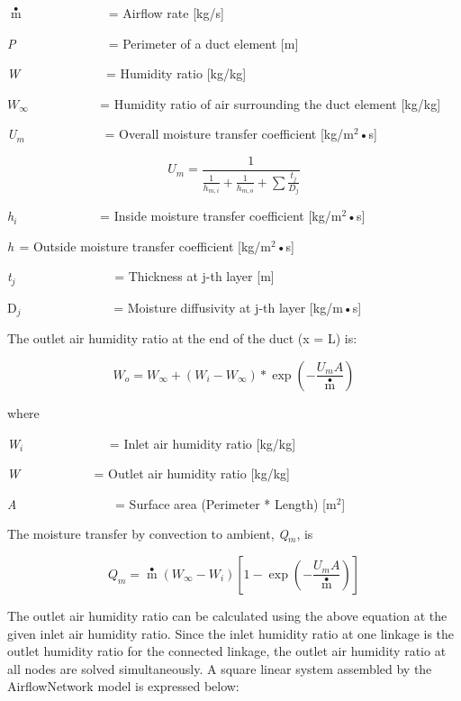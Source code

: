 \(\mathop m\limits^ \bullet\) ~~~~~~~~~~~~ = Airflow rate {[}kg/s{]}

\emph{P~~~}~~~~~~~~~~~ = Perimeter of a duct element {[}m{]}

\emph{W~~}~~~~~~~~~~~ = Humidity ratio {[}kg/kg{]}

\(W{}_\infty\) ~~~~~~~~~~ = Humidity ratio of air surrounding the duct element {[}kg/kg{]}

\emph{U\(_{m}\)}~~~~~~~~~~~~ = Overall moisture transfer coefficient {[}kg/m\(^{2}\)•s{]}

\begin{equation}
{U_m} = \frac{1}{{\frac{1}{{{h_{m,i}}}} + \frac{1}{{{h_{m,o}}}} + \sum {\frac{{{t_j}}}{{{D_j}}}} }}
\end{equation}

\emph{h\(_{i}\)} \(_{ }\) ~~~~~~~~~~~ = Inside moisture transfer coefficient {[}kg/m\(^{2}\)•s{]}

\emph{h\(_{ }\)}\(_{ }\) = Outside moisture transfer coefficient {[}kg/m\(^{2}\)•s{]}

\emph{t\(_{j}\)}~~~~~~~~~~~~~~~ = Thickness at j-th layer {[}m{]}

D\(_{j}\)~~~~~~~~~~~~~~ = Moisture diffusivity at j-th layer {[}kg/m•s{]}

The outlet air humidity ratio at the end of the duct (x = L) is:

\begin{equation}
{W_o} = {W_\infty } + ({W_i} - {W_\infty })*\exp \left( { - \frac{{{U_m}A}}{{\mathop m\limits^ \bullet  }}} \right)
\end{equation}

where

\emph{W\(_{i}\)}~~~~~~~~~~~~~ = Inlet air humidity ratio {[}kg/kg{]}

\emph{W\(_{ }\)}~~~~~~~~~~~ = Outlet air humidity ratio {[}kg/kg{]}

\emph{A}~~~~~~~~~~~~~~~ = Surface area (Perimeter * Length) {[}m\(^{2}\){]}

The moisture transfer by convection to ambient, \emph{Q\(_{m}\)}, is

\begin{equation}
{Q_m} = \mathop m\limits^ \bullet  ({W_\infty } - {W_i})\left[ {1 - \exp \left( { - \frac{{{U_m}A}}{{\mathop m\limits^ \bullet  }}} \right)} \right]
\end{equation}

The outlet air humidity ratio can be calculated using the above equation at the given inlet air humidity ratio. Since the inlet humidity ratio at one linkage is the outlet humidity ratio for the connected linkage, the outlet air humidity ratio at all nodes are solved simultaneously. A square linear system assembled by the AirflowNetwork model is expressed below:

